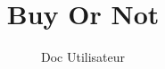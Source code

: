 \documentclass{BetterDocument}
\title{Buy Or Not}
\subtitle{Doc Utilisateur}
\date{}
\begin{document}
\pageDeGarde

\tableDesMatieres
\end{document}
